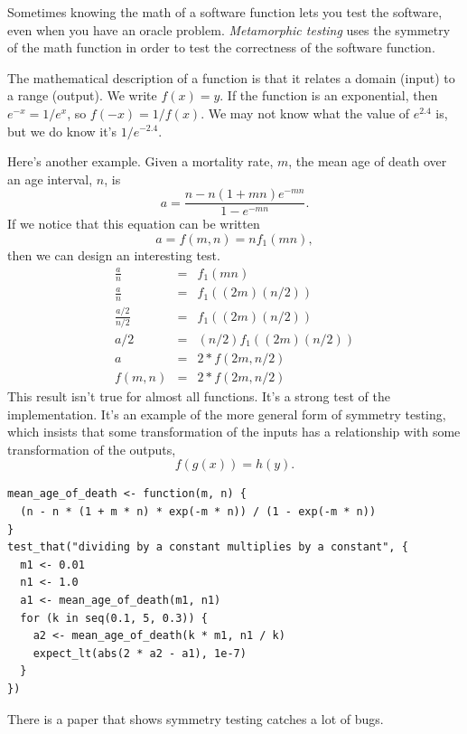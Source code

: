\documentclass[fleqn,10pt]{olplainarticle}
\begin{document}
Sometimes knowing the math of a software function lets you
test the software, even when you have an oracle problem.
\emph{Metamorphic testing} uses the symmetry of the math function
in order to test the correctness of the software function.

The mathematical description of a function is that it relates
a domain (input) to a range (output). We write $f(x) = y$.
If the function is an exponential, then $e^{-x} = 1 / e^x$,
so $f(-x) = 1 / f(x)$. We may not know what the value of
$e^2.4$ is, but we do know it's $1 / e^{-2.4}$.

Here's another example. Given a mortality rate, $m$, the
mean age of death over an age interval, $n$, is
\begin{equation}
    a = \frac{n - n(1+m n)e^{-m n}}{1 - e^{-m n}}.
\end{equation}
If we notice that this equation can be written
\begin{equation}
    a = f(m, n) = n  f_1(m  n),
\end{equation}
then we can design an interesting test.
\begin{eqnarray}
    \frac{a}{n} &= &f_1(m  n) \\
    \frac{a}{n} &= & f_1((2  m)  (n / 2)) \\
    \frac{a/2}{n/2} &= & f_1((2  m)  (n / 2)) \\
    a /2 &= & (n/2) f_1((2  m)  (n / 2)) \\
    a &= &2 * f(2m, n/2) \\
    f(m, n) & =& 2 * f(2m, n/2)
\end{eqnarray}
This result isn't true for almost all functions. It's a strong test
of the implementation. It's an example of the more general
form of symmetry testing, which insists that some transformation
of the inputs has a relationship with some transformation of the 
outputs,
\begin{equation}
    f(g(x)) = h(y).
\end{equation}

\begin{lstlisting}
mean_age_of_death <- function(m, n) {
  (n - n * (1 + m * n) * exp(-m * n)) / (1 - exp(-m * n))
}
test_that("dividing by a constant multiplies by a constant", {
  m1 <- 0.01
  n1 <- 1.0
  a1 <- mean_age_of_death(m1, n1)
  for (k in seq(0.1, 5, 0.3)) {
    a2 <- mean_age_of_death(k * m1, n1 / k)
    expect_lt(abs(2 * a2 - a1), 1e-7)
  }
})
\end{lstlisting}

There is a paper that shows symmetry testing catches a lot of bugs.
\end{document}
